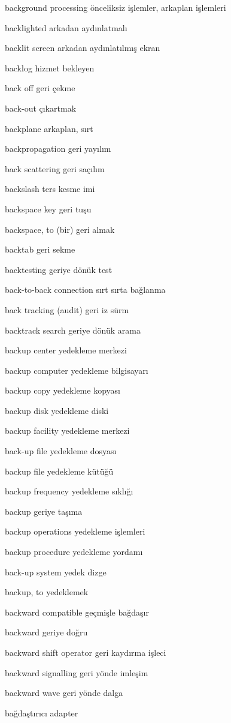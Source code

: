 \documentclass[12pt,fleqn]{article}\usepackage{../../common}
\begin{document}
background processing önceliksiz işlemler, arkaplan işlemleri

backlighted arkadan aydınlatmalı

backlit screen arkadan aydınlatılmış ekran

backlog hizmet bekleyen

back off geri çekme

back-out çıkartmak

backplane arkaplan, sırt

backpropagation geri yayılım

back scattering geri saçılım

backslash ters kesme imi

backspace key geri tuşu

backspace, to (bir) geri almak

backtab geri sekme

backtesting geriye dönük test

back-to-back connection sırt sırta bağlanma

back tracking (audit) geri iz sürm

backtrack search geriye dönük arama

backup center yedekleme merkezi

backup computer yedekleme bilgisayarı

backup copy yedekleme kopyası

backup disk yedekleme diski

backup facility yedekleme merkezi

back-up file yedekleme dosyası

backup file yedekleme kütüğü

backup frequency yedekleme sıklığı

backup geriye taşıma

backup operations yedekleme işlemleri

backup procedure yedekleme yordamı

back-up system yedek dizge

backup, to yedeklemek

backward compatible geçmişle bağdaşır

backward geriye doğru

backward shift operator geri kaydırma işleci

backward signalling geri yönde imleşim

backward wave geri yönde dalga

bağdaştırıcı adapter
\end{document}
